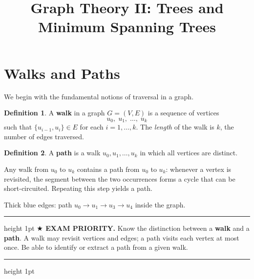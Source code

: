 \documentclass[11pt]{article}
\title{Graph Theory II: Trees and Minimum Spanning Trees}
\date{}
\author{}
\theoremstyle{definition}
\newtheorem*{definition*}{Definition}
\newenvironment{exambox}
  {\par\medskip\noindent\begin{center}\begin{minipage}{0.92\textwidth}%
   \hrule height 1pt \vspace{4pt}\noindent\textbf{$\bigstar$ EXAM PRIORITY.} }
  {\vspace{4pt}\hrule height 1pt \end{minipage}\end{center}\medskip}
\begin{document}
\maketitle

\section*{Walks and Paths}

We begin with the fundamental notions of traversal in a graph.

\begin{definition*}
A \textbf{walk} in a graph $G = (V, E)$ is a sequence of vertices
\[
  u_0,\; u_1,\; \ldots,\; u_k
\]
such that $\{u_{i-1}, u_i\} \in E$ for each $i = 1, \ldots, k$.
The \emph{length} of the walk is $k$, the number of edges traversed.
\end{definition*}

\begin{definition*}
A \textbf{path} is a walk $u_0, u_1, \ldots, u_k$ in which all vertices are distinct.
\end{definition*}

Any walk from $u_0$ to $u_k$ contains a path from $u_0$ to $u_k$: whenever a vertex
is revisited, the segment between the two occurrences forms a cycle that can be
short-circuited.  Repeating this step yields a path.

\begin{center}

\smallskip
{\small Thick blue edges: path $u_0 \to u_1 \to u_3 \to u_4$ inside the graph.}
\end{center}

\begin{exambox}
Know the distinction between a \textbf{walk} and a \textbf{path}.
A walk may revisit vertices and edges; a path visits each vertex at most once.
Be able to identify or extract a path from a given walk.
\end{exambox}
\end{document}
